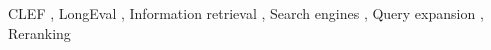\documentclass{ceurart}
\begin{document}
\begin{keywords}
	CLEF \sep
	LongEval \sep
	Information retrieval \sep
	Search engines \sep
	Query expansion \sep
	Reranking
\end{keywords}

\maketitle

















\end{document}
